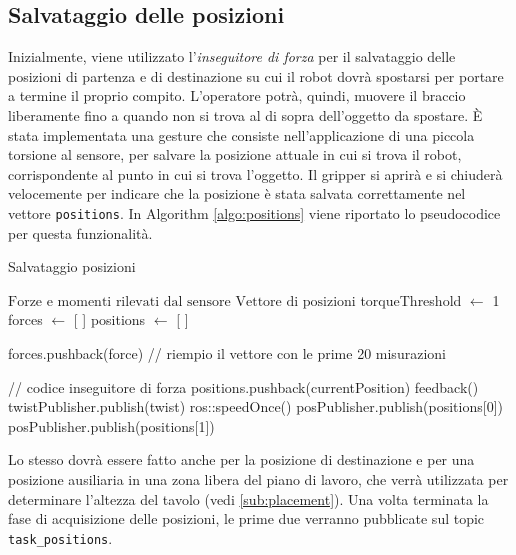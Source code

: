 \subsection{Salvataggio delle posizioni} \label{sub:positions}
Inizialmente, viene utilizzato l'\textit{inseguitore di forza} per il salvataggio delle posizioni di partenza e di destinazione 
su cui il robot dovr\`{a} spostarsi per portare a termine il proprio compito. 
L'operatore potr\`{a}, quindi, muovere il braccio liberamente fino a quando non si trova al di sopra dell'oggetto da spostare. 
\`{E} stata implementata una gesture che consiste nell'applicazione di una piccola torsione al sensore, 
per salvare la posizione attuale in cui si trova il robot, corrispondente al punto in cui si trova l'oggetto. Il gripper 
si aprir\`{a} e si chiuder\`{a} velocemente per indicare che la posizione \`{e} stata salvata correttamente nel vettore 
\verb|positions|. In Algorithm \ref{algo:positions} viene riportato lo pseudocodice per questa funzionalit\`{a}.
\begin{algorithm}[H]
    \caption{Salvataggio posizioni}\label{algo:positions}
    \begin{algorithmic}[1]
        \Require $\text{Forze e momenti rilevati dal sensore}$
        \Ensure $\text{Vettore di posizioni}$
        \State torqueThreshold $\gets$ 1
        \State forces $\gets$ [ ]
        \State positions $\gets$ [ ]
        
                \State forces.pushback(force) // riempio il vettore con le prime 20 misurazioni
            \Else

                // codice inseguitore di forza
                    \State positions.pushback(currentPosition)
                    \State feedback()
                \EndIf
                \State twistPublisher.publish(twist)
            \EndIf
            \State ros::speedOnce()
        \EndWhile
        \State posPublisher.publish(positions[0])
        \State posPublisher.publish(positions[1])
    \end{algorithmic}
    \end{algorithm}
Lo stesso dovr\`{a} essere fatto anche per la posizione di destinazione e per una posizione ausiliaria in una zona libera 
del piano di lavoro, che verr\`{a} utilizzata per determinare l'altezza del tavolo (vedi \ref{sub:placement}). 
Una volta terminata la fase di acquisizione delle posizioni, 
le prime due verranno pubblicate sul topic \verb|task_positions|.
